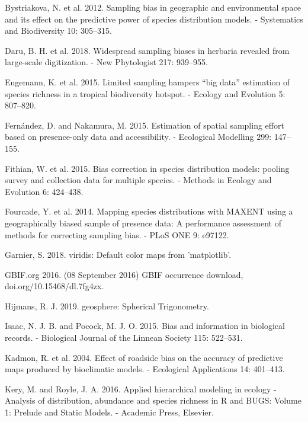 \documentclass[
  12pt,
]{article}
\begin{document}
\leavevmode\hypertarget{ref-Bystriakova2012}{}%
Bystriakova, N. et al. 2012. Sampling bias in geographic and environmental space and its effect on the predictive power of species distribution models. - Systematics and Biodiversity 10: 305--315.

\leavevmode\hypertarget{ref-Daru2018}{}%
Daru, B. H. et al. 2018. Widespread sampling biases in herbaria revealed from large-scale digitization. - New Phytologist 217: 939--955.

\leavevmode\hypertarget{ref-Engemann2015}{}%
Engemann, K. et al. 2015. Limited sampling hampers ``big data'' estimation of species richness in a tropical biodiversity hotspot. - Ecology and Evolution 5: 807--820.

\leavevmode\hypertarget{ref-Fernandez2015}{}%
Fernández, D. and Nakamura, M. 2015. Estimation of spatial sampling effort based on presence-only data and accessibility. - Ecological Modelling 299: 147--155.

\leavevmode\hypertarget{ref-Fithian2014}{}%
Fithian, W. et al. 2015. Bias correction in species distribution models: pooling survey and collection data for multiple species. - Methods in Ecology and Evolution 6: 424--438.

\leavevmode\hypertarget{ref-Fourcade2014}{}%
Fourcade, Y. et al. 2014. Mapping species distributions with MAXENT using a geographically biased sample of presence data: A performance assessment of methods for correcting sampling bias. - PLoS ONE 9: e97122.

\leavevmode\hypertarget{ref-Garnier2018}{}%
Garnier, S. 2018. viridis: Default color maps from 'matplotlib'.

\leavevmode\hypertarget{ref-gbifdoi2016}{}%
GBIF.org 2016. (08 September 2016) GBIF occurrence download, doi.org/10.15468/dl.7fg4zx.

\leavevmode\hypertarget{ref-Hijmans2019}{}%
Hijmans, R. J. 2019. geosphere: Spherical Trigonometry.

\leavevmode\hypertarget{ref-Isaac2015}{}%
Isaac, N. J. B. and Pocock, M. J. O. 2015. Bias and information in biological records. - Biological Journal of the Linnean Society 115: 522--531.

\leavevmode\hypertarget{ref-Kadmon2004}{}%
Kadmon, R. et al. 2004. Effect of roadside bias on the accuracy of predictive maps produced by bioclimatic models. - Ecological Applications 14: 401--413.

\leavevmode\hypertarget{ref-Kery2016}{}%
Kery, M. and Royle, J. A. 2016. Applied hierarchical modeling in ecology - Analysis of distribution, abundance and species richness in R and BUGS: Volume 1: Prelude and Static Models. - Academic Press, Elsevier.
\end{document}
